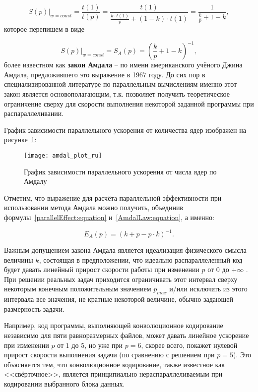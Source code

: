 \begin{equation}
    \left.S(p)\right|_{w = const} = \frac{t(1)}{t(p)} = \frac{t(1)}{{\displaystyle\frac{k \cdot t(1)}{p}} + (1 - k) \cdot t(1)} = \frac{1}{{\displaystyle\frac{k}{p}} + 1 - k},
\end{equation}
которое перепишем в виде

\begin{equation}
    \label{AmdalLaw:equation}
    \left.S(p)\right|_{w=const} = S_A(p) = \left(\frac{k}{p} + 1 - k\right)^{-1},
\end{equation}
более известном как \textbf{закон Амдала} – по имени американского учёного Джина Амдала, предложившего это выражение в 1967 году. До сих пор в специализированной литературе по параллельным вычислениям именно этот закон является основополагающим, т.к. позволяет получить теоретическое ограничение сверху для скорости выполнения некоторой заданной программы при распараллеливании.

График зависимости параллельного ускорения от количества ядер изображен на рисунке~\ref{GraphAmdalSFromP:image}:

\begin{figure}[H]
    \texttt{[image: amdal\_plot\_ru]}
    \caption{График зависимости параллельного ускорения от числа ядер по Амдалу}
    \label{GraphAmdalSFromP:image}
\end{figure}

Отметим, что выражение для расчёта параллельной эффективности при использовании метода Амдала можно получить, объединив формулы~\eqref{parallelEffect:equation} и~\eqref{AmdalLaw:equation}, а именно:


\begin{equation}
    E_A(p) = \left(k + p - p \cdot k\right)^{-1}.
\end{equation}

Важным допущением закона Амдала является идеализация физического смысла величины $k$, состоящая в предположении, что идеально распараллеленный код будет давать линейный прирост скорости работы при изменении $p$ от $0$ до $+\infty$ . При решении реальных задач приходится ограничивать этот интервал сверху некоторым конечным положительным значением $p_{max}$ и/или исключать из этого интервала все значения, не кратные некоторой величине, обычно задающей размерность задачи.

Например, код программы, выполняющей конволюционное кодирование независимо для пяти равноразмерных файлов, может давать линейное ускорение при изменении $p$ от $1$ до $5$, но уже при $p=6$, скорее всего, покажет нулевой прирост скорости выполнения задачи (по сравнению с решением при $p=5$). Это объясняется тем, что  конволюционное кодирование, также известное как <<свёрточное>>, является принципиально нераспараллеливаемым при кодировании выбранного блока данных.
